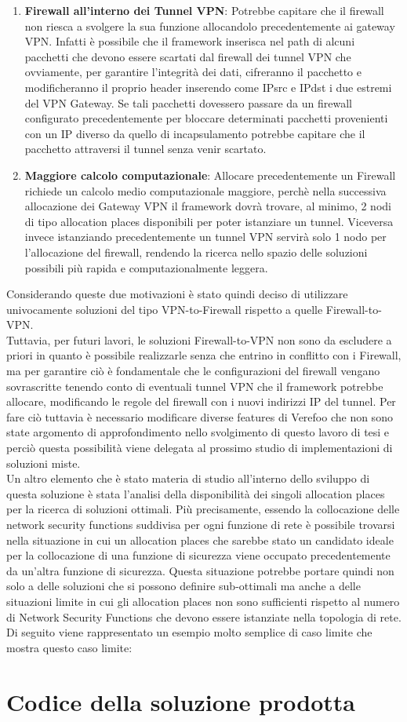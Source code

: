 \begin{enumerate}
    \item \textbf{Firewall all'interno dei Tunnel VPN}: Potrebbe capitare che il firewall non riesca a svolgere la sua funzione allocandolo precedentemente ai gateway VPN. Infatti è possibile che il framework
        inserisca nel path di alcuni pacchetti che devono essere scartati dal firewall dei tunnel VPN che ovviamente, per garantire l'integrità dei dati, cifreranno il pacchetto e modificheranno il proprio header
        inserendo come IPsrc e IPdst i due estremi del VPN Gateway. Se tali pacchetti dovessero passare da un firewall configurato precedentemente per bloccare determinati pacchetti provenienti con un IP diverso da quello di incapsulamento 
        potrebbe capitare che il pacchetto attraversi il tunnel senza venir scartato.
    \item \textbf{Maggiore calcolo computazionale}: Allocare precedentemente un Firewall richiede un calcolo medio computazionale maggiore, perchè nella successiva allocazione dei Gateway VPN il framework dovrà trovare, al minimo, 2 nodi 
        di tipo allocation places disponibili per poter istanziare un tunnel. Viceversa invece istanziando precedentemente un tunnel VPN servirà solo 1 nodo per l'allocazione del firewall, rendendo la ricerca nello spazio delle soluzioni possibili
        più rapida e computazionalmente leggera.
\end{enumerate}

Considerando queste due motivazioni è stato quindi deciso di utilizzare univocamente soluzioni del tipo VPN-to-Firewall rispetto a quelle Firewall-to-VPN.\\
Tuttavia, per futuri lavori, le soluzioni Firewall-to-VPN non sono da escludere a priori in quanto è possibile realizzarle senza che entrino in conflitto con i Firewall, ma per 
garantire ciò è fondamentale che le configurazioni del firewall vengano sovrascritte tenendo conto di eventuali tunnel VPN che il framework potrebbe allocare, modificando le regole del firewall con i nuovi indirizzi IP del tunnel. Per fare ciò tuttavia è necessario modificare
diverse features di Verefoo che non sono state argomento di approfondimento nello svolgimento di questo lavoro di tesi e perciò questa possibilità viene delegata al prossimo studio di implementazioni di soluzioni miste.
\\
Un altro elemento che è stato materia di studio all'interno dello sviluppo di questa soluzione è stata l'analisi della disponibilità dei singoli allocation places per la ricerca di soluzioni ottimali.
Più precisamente, essendo la collocazione delle network security functions suddivisa per ogni funzione di rete è possibile trovarsi nella situazione in cui un allocation places che sarebbe stato un candidato ideale per la collocazione di una funzione di sicurezza viene occupato
precedentemente da un'altra funzione di sicurezza. Questa situazione potrebbe portare quindi non solo a delle soluzioni che si possono definire sub-ottimali ma anche a delle situazioni limite in cui gli allocation places non sono sufficienti rispetto al numero di Network Security Functions
che devono essere istanziate nella topologia di rete. Di seguito viene rappresentato un esempio molto semplice di caso limite che mostra questo caso limite: 
\section{Codice della soluzione prodotta}